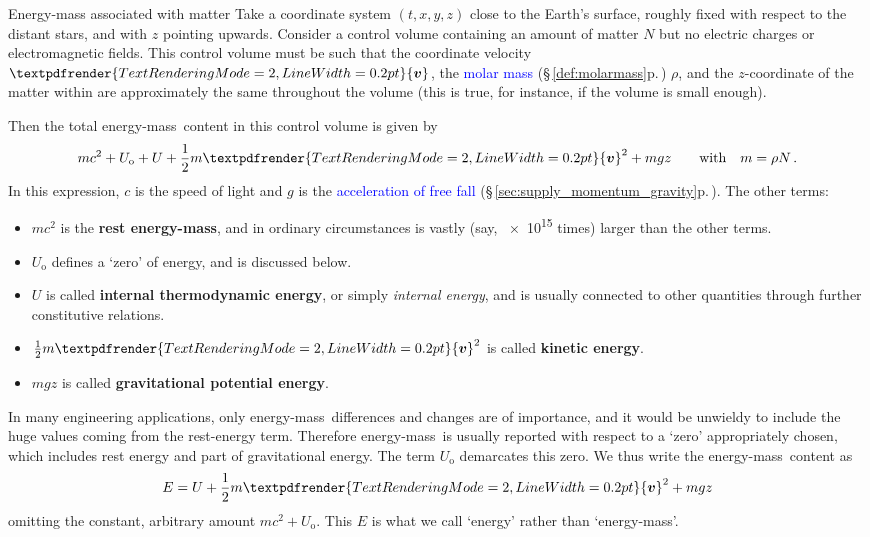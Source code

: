 \documentclass[a4paper,12pt,%
onecolumn,oneside,%
british%
]{memoir}
\renewcommand*{\bm}[1]{\textpdfrender{TextRenderingMode=2,LineWidth=0.2pt}{\boldsymbol{#1}}}
\renewcommand*{\|}[1][]{\nonscript\:#1\vert\nonscript\:\mathopen{}}
\newcommand*{\sect}{\S}%
\renewcommand*{\autoref}[3][\sect\,\ref]{\textcolor{blue}{#3} {\color{blue}\scriptsize(\faIcon[regular]{eye}\;#1{#2}\;p.\,\pageref{#2})}}
\newcommand*{\energym}{energy-mass}
\newcommand*{\yc}{c} %
\newcommand*{\yv}{\bm{v}}
\newcommand*{\yN}{N}
\newcommand*{\yrho}{\rho}
\newcommand*{\ym}{m}%
\newcommand*{\yE}{E}
\newcommand*{\yU}{U}
\newcommand*{\yUo}{\yU_{\textrm{o}}}
\begin{document}
\begin{definition}{Energy-mass associated with matter}\label{def:energy_volume_matter}
  Take a coordinate system $(t,x,y,z)$ close to the Earth's surface, roughly fixed with respect to the distant stars, and with $z$ pointing upwards. Consider a control volume containing an amount of matter $\yN$ but no electric charges or electromagnetic fields. This control volume must be such that the coordinate velocity $\yv$, the \autoref{def:molarmass}{molar mass} $\yrho$, and the $z$-coordinate of the matter within are approximately the same throughout the volume (this is true, for instance, if the volume is small enough).

  \smallskip

  Then the total \energym\ content in this control volume is given by
  \begin{equation}
    \label{eq:energy_volume_matter}
    \ym \yc^{2} +  \yUo + \yU + \frac{1}{2}\ym \yv^{2} + \ym g z
    \qquad\text{with}\quad \ym = \yrho\yN \,.
  \end{equation}
  In this expression, $\yc$ is the speed of light and $g$ is the \autoref{sec:supply_momentum_gravity}{acceleration of free fall}. %
  The other terms:
  \begin{itemize}
  \item $\ym \yc^{2}$ is the \textbf{rest \energym}, and in ordinary circumstances is vastly (say, \num{e15} times) larger than the other terms.

  \item $\yUo$ defines a \enquote*{zero} of energy, and is discussed below.
    
  \item $\yU$ is called \textbf{internal thermodynamic energy}, or simply \emph{internal energy}, and is usually connected to other quantities through further constitutive relations.

  \item $\frac{1}{2}\ym \yv^{2}$ is called \textbf{kinetic energy}.

  \item $\ym g z$ is called \textbf{gravitational potential energy}.
  \end{itemize}

  \medskip

  In many engineering applications, only \energym\ differences and changes are of importance, and it would be unwieldy to include the huge values coming from the rest-energy term. Therefore \energym\ is usually reported with respect to a \enquote*{zero} appropriately chosen, which includes rest energy and part of gravitational energy. The term $\yUo$ demarcates this zero. We thus write the \energym\ content as
  \begin{equation}
    \label{eq:thermodynamic_energy}
    \yE = \yU + \frac{1}{2}\ym \yv^{2} + \ym g z
  \end{equation}
  omitting the constant, arbitrary amount $\ym\yc^{2} + \yUo$. This $\yE$ is what we call \enquote*{energy} rather than \enquote*{\energym}.
\end{definition}
\end{document}
